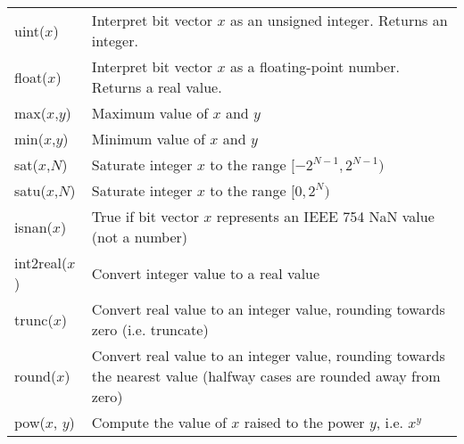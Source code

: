 \begin{tabular}{lp{340pt}}
uint($x$) & Interpret bit vector $x$ as an unsigned integer. Returns an
            integer. \\
float($x$) & Interpret bit vector $x$ as a floating-point number. Returns a real
             value. \\
max($x$,$y$) & Maximum value of $x$ and $y$ \\
min($x$,$y$) & Minimum value of $x$ and $y$ \\
sat($x$,$N$) & Saturate integer $x$ to the range $[-2^{N-1},2^{N-1})$ \\
satu($x$,$N$) & Saturate integer $x$ to the range $[0,2^{N})$ \\
isnan($x$) & True if bit vector $x$ represents an IEEE 754 NaN value (not a
             number) \\
int2real($x$) & Convert integer value to a real value \\
trunc($x$) & Convert real value to an integer value, rounding towards zero (i.e.
             truncate) \\
round($x$) & Convert real value to an integer value, rounding towards the
             nearest value (halfway cases are rounded away from zero) \\
pow($x$, $y$) & Compute the value of $x$ raised to the power $y$, i.e. $x^{y}$
\end{tabular}

\clearpage


